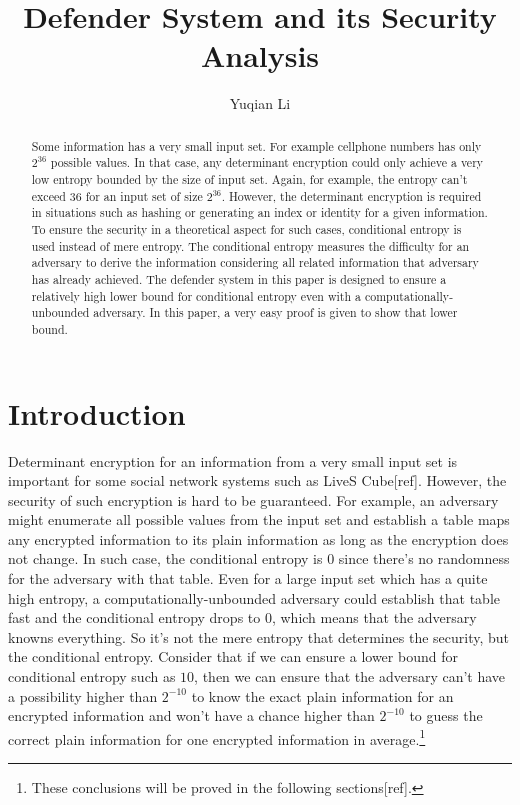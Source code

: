 \documentclass[10pt,a4paper]{article}
\author{Yuqian Li}
\title{Defender System and its Security Analysis}
\date{}
\begin{document}
\maketitle
\begin{abstract}
	Some information has a very small input set. For example
	cellphone numbers has only $2^{36}$ possible values. In that case, any
	determinant encryption could only
	achieve a very low entropy bounded by the size of input set.
	Again, for example, the entropy can't exceed $36$ for an input set
	of size $2^{36}$. However, the determinant encryption is required
	in situations such as hashing or generating an index or identity for a
	given information. To ensure the security in a theoretical aspect
	for such cases, conditional entropy is used instead of mere entropy.
	The conditional entropy measures the difficulty for an adversary to
	derive the information considering all related information 
	that adversary has already achieved.
	The defender system in this paper is designed to ensure a relatively high lower
	bound for conditional entropy even with a computationally-unbounded adversary.
	In this paper, a very easy proof is given to show that lower bound.
\end{abstract}

\section{Introduction}
	Determinant encryption for an information from
	a very small input set is important for some social
	network systems such as LiveS Cube[ref]. However, the security
	of such encryption is hard to be guaranteed. For example, an
	adversary might enumerate all possible values from the
	input set and establish a table maps any encrypted
	information to its plain information as long as the encryption
	does not change. In such case, the conditional entropy
	is $0$ since there's no randomness for the adversary with that table.
	Even for a large input set which has a quite high entropy, a
	computationally-unbounded adversary could establish that table
	fast and the conditional entropy drops to $0$, which means that the
	adversary knowns everything. So it's not the mere entropy that
	determines the security, but the conditional entropy. Consider
	that if we can ensure a lower bound for conditional entropy such as $10$,
	then we can ensure that the adversary can't have a possibility
	higher than $2^{-10}$ to know the exact plain information for
	an encrypted information and won't have a chance
	higher than $2^{-10}$ to guess the correct plain information 
	for one encrypted information in average.\footnote{These conclusions will
	be proved in the following sections[ref].}
	
\end{document}
